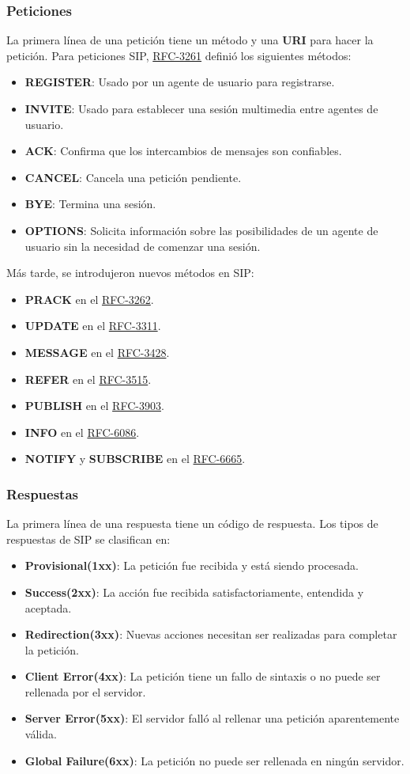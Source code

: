 \documentclass[a4paper, 11pt]{article} %
\newcommand{\RFC}[1]{\href{https://www.ietf.org/rfc/rfc#1.txt}{RFC-#1}}
\begin{document}
		\subsubsection{Peticiones}
		La primera línea de una petición tiene un método y una \textbf{URI} para hacer la petición. Para peticiones SIP, \RFC{3261} definió los siguientes métodos:
		\begin{itemize}
			\item \textbf{REGISTER}: Usado por un agente de usuario para registrarse.
			\item \textbf{INVITE}: Usado para establecer una sesión multimedia entre agentes de usuario.
			\item \textbf{ACK}: Confirma que los intercambios de mensajes son confiables.
			\item \textbf{CANCEL}: Cancela una petición pendiente.
			\item \textbf{BYE}: Termina una sesión.
			\item \textbf{OPTIONS}: Solicita información sobre las posibilidades de un agente de usuario sin la necesidad de comenzar una sesión.
		\end{itemize}
		Más tarde, se introdujeron nuevos métodos en SIP:
		\begin{itemize}
			\item \textbf{PRACK} en el \RFC{3262}.
			\item \textbf{UPDATE} en el \RFC{3311}.
			\item \textbf{MESSAGE} en el \RFC{3428}.
			\item \textbf{REFER} en el \RFC{3515}.
			\item \textbf{PUBLISH} en el \RFC{3903}.
			\item \textbf{INFO} en el \RFC{6086}.
			\item \textbf{NOTIFY} y \textbf{SUBSCRIBE} en el \RFC{6665}.
		\end{itemize}
		\subsubsection{Respuestas}
		La primera línea de una respuesta tiene un código de respuesta. Los tipos de respuestas de SIP se clasifican en:
		\begin{itemize}
			\item \textbf{Provisional(1xx)}: La petición fue recibida y está siendo  procesada.
			\item \textbf{Success(2xx)}: La acción fue recibida satisfactoriamente, entendida y aceptada.
			\item \textbf{Redirection(3xx)}: Nuevas acciones necesitan ser realizadas para completar la petición.
			\item \textbf{Client Error(4xx)}: La petición tiene un fallo de sintaxis o no puede ser rellenada por el servidor.
			\item \textbf{Server Error(5xx)}: El servidor falló al rellenar una petición aparentemente válida.
			\item \textbf{Global Failure(6xx)}: La petición no puede ser rellenada en ningún servidor.
		\end{itemize}
\end{document}
